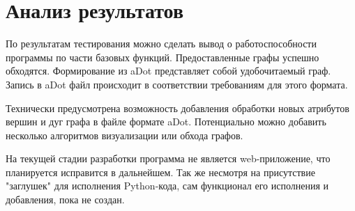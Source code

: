 \chapter{Анализ результатов}\label{chap6_results_analysis}

По результатам тестирования можно сделать вывод о работоспособности программы по части базовых функций. Предоставленные графы успешно обходятся. Формирование из aDot представляет собой удобочитаемый граф. Запись в aDot файл происходит в соответствии требованиям для этого формата.

Технически предусмотрена возможность добавления обработки новых атрибутов вершин и дуг графа в файле формате aDot. Потенциально можно добавить несколько алгоритмов визуализации или обхода графов.

На текущей стадии разработки программа не является web-приложение, что планируется исправится в дальнейшем. Так же несмотря на присутствие "заглушек" для исполнения Python-кода, сам функционал его исполнения и добавления, пока не создан.


